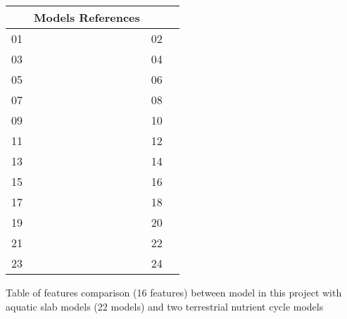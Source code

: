 \documentclass[../thesis.tex]{subfiles} %
\begin{document}
\begin{longtable}{p{.05\linewidth}p{.4\linewidth}p{.05\linewidth}p{.4\linewidth}}
    & \textbf{Models References} \\\hline
    01&\autocite{evans1985model} & 02&\autocite{frost1987grazing} \\
    03&\autocite{fasham1990nitrogen} &    04&\autocite{robinson1993simulated} \\
    05&\autocite{fasham1995use} & 06&\autocite{matear1995parameter} \\
    07&\autocite{hurtt1996pelagic} & 08&\autocite{xiao1996relative} \\
    09&\autocite{popova1997chaotic} &    10&\autocite{anderson1998modelling} \\
    11&\autocite{spitz1998data} & 12&\autocite{fennel2001testing} \\
    13&\autocite{natvik2001weak} & 14&\autocite{schartau2001parameter} \\
    15&\autocite{spitz2001configuring} &    16&\autocite{ito2002simulation} \\
    17&\autocite{hemmings2004split} & 18&\autocite{onitsuka2005differences} \\
    19&\autocite{findlay2006modelling} & 20&\autocite{mitra2007accounting} \\
    21&\autocite{mitra2009closure} &    22&\autocite{llebot2010role} \\
    23&\autocite{kidston2013phytoplankton} & 24&\autocite{anderson2015empower} \\
\hline\end{longtable}

\setcounter{table}{0}
\begin{table}[H]
    \centering
    \caption[Model features comparison]{Table of features comparison (16 features) between model in this project with aquatic slab models (22 models) and two terrestrial nutrient cycle models}
    \label{modComp}
\end{table}
\end{document}
